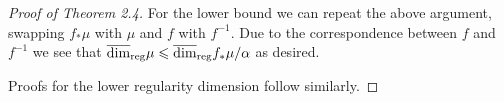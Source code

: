 \begin{proof}[Proof of Theorem 2.4]
	For the lower bound we can repeat the above argument, swapping $f_*\mu$ with $\mu$ and $f$ with $f^{-1}$. Due to the correspondence between $f$ and $f^{-1}$ we see that $\overline{\dim}_{\textup{reg}}  \mu \leqslant  \overline{\dim}_{\textup{reg}} f_* \mu / \alpha$ as desired.
	
	\begin{comment}
	For the lower bound of the upper regularity dimension, first note that for any $\varepsilon > 0$ there exists a sequence of $x_k \in X$ and $0< r_K < R_k$, with $R_k / r_k$ tending to infinity, such that for all $k\in \mathbb{N}$
	\[
	\frac{\mu(B(x_k,R_k))}{\mu(B(x_k,r_k))} \ge C_{\varepsilon} \left(\frac{R_k}{r_k} \right)^{\urdim \mu-\varepsilon}.
	\]
	We will fix $\varepsilon>0$ and the corresponding sequences for the rest of this proof.
	
	Whilst the upper regularity dimension of the pushforward will not necessarily be obtained by considering the image of these sequences, it will allow us to find a lower bound. The difficulty lies in constructing suitable images of these sequences. The natural image of the sequence $(x_k)$ is just $(f(x_k) )$. To find the corresponding diameters we fix $x\in X$ and $R>0$. Then define $R^{\sup} = \sup_{y \in B(x,R)} d_Y( f(x) , f(y) )$ and $R^{\inf} = \inf_{y \in B(x,R) \setminus B(x,R/2)} \eta(1) d_Y(f(x) , f(y))$, note $R_{\inf}$ is not quite the first number with the supremum replaced by the infimum. $z_{R}^{\sup} \in X$ is chosen to be the point for which the supremum is attained and $z_{R}^{\inf}$ comes from the infimum. The supremum and infimum are attained as $B(x,R)$ is compact and $f(x)$ is a quasisymmetric homeomorphism. We can also see that $z_{R}^{\sup} \neq x \neq z_{R}^{\inf}$. If $R_k/r_k \rightarrow \infty$ as $k$ grows, then so will $R_k^{\sup}/r_k^{\inf}$. Thus we have for any $k\in \mathbb{N}$
	\begin{align*}
	\frac{f_* \mu(B(f(x_k),R_k^{\sup}))}{f_*\mu(B(f(x_k),r_k^{\inf}))} &\ge \frac{\mu(B(x_k,R_k))}{\mu(B(x_k,r_k))} \\
	& \ge  C_{\varepsilon} \left(\frac{R_k}{r_k} \right)^{\urdim \mu-\varepsilon} \\ 
	& \ge C_{\varepsilon} \left ( \frac{d_X(x, z_{R_k}^{\sup} )}{2d_X( x, z_{r_k}^{\inf} )}\right)^{\urdim \mu-\varepsilon} \\
	& \ge \frac{C_{\varepsilon}c_\eta}{2^{\urdim \mu-\varepsilon}} \left(\frac{d_Y (f(x) , f(z_{R_k}^{\sup}))}{ d_Y( f(x), f(z_{r_k}^{\inf}) )} \right)^{\alpha(\urdim \mu-\varepsilon)} \\
	& = \frac{C_{\varepsilon}c_\eta}{2^{\urdim \mu-\varepsilon}}\left(\frac{R_k^{\sup}}{r_k^{\inf}} \right)^{\alpha(\urdim \mu-\varepsilon)}
	\end{align*}
	completing the proof.
	
	\end{comment}
	
	Proofs for the lower regularity dimension follow similarly.
	
	
\end{proof}









